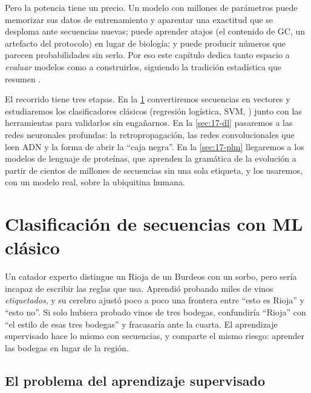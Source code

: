 Pero la potencia tiene un precio. Un modelo con millones de parámetros puede memorizar sus datos de entrenamiento y aparentar una exactitud que se desploma ante secuencias nuevas; puede aprender atajos (el contenido de GC, un artefacto del protocolo) en lugar de biología; y puede producir números que parecen probabilidades sin serlo. Por eso este capítulo dedica tanto espacio a \emph{evaluar} modelos como a construirlos, siguiendo la tradición estadística que resumen \textcite{c17-hastie2009}.

El recorrido tiene tres etapas. En la \cref{sec:17-clasico} convertiremos secuencias en vectores y estudiaremos los clasificadores clásicos (regresión logística, SVM, ) junto con las herramientas para validarlos sin engañarnos. En la \cref{sec:17-dl} pasaremos a las redes neuronales profundas: la retropropagación, las redes convolucionales que leen ADN y la forma de abrir la ``caja negra''. En la \cref{sec:17-plm} llegaremos a los modelos de lenguaje de proteínas, que aprenden la gramática de la evolución a partir de cientos de millones de secuencias sin una sola etiqueta, y los usaremos, con un modelo real, sobre la ubiquitina humana.

\section{Clasificación de secuencias con ML clásico}\label{sec:17-clasico}

\begin{intuicion}
Un catador experto distingue un Rioja de un Burdeos con un sorbo, pero sería incapaz de escribir las reglas que usa. Aprendió probando miles de vinos \emph{etiquetados}, y su cerebro ajustó poco a poco una frontera entre ``esto es Rioja'' y ``esto no''. Si solo hubiera probado vinos de tres bodegas, confundiría ``Rioja'' con ``el estilo de esas tres bodegas'' y fracasaría ante la cuarta. El aprendizaje supervisado hace lo mismo con secuencias, y comparte el mismo riesgo: aprender las bodegas en lugar de la región.
\end{intuicion}

\subsection{El problema del aprendizaje supervisado}

